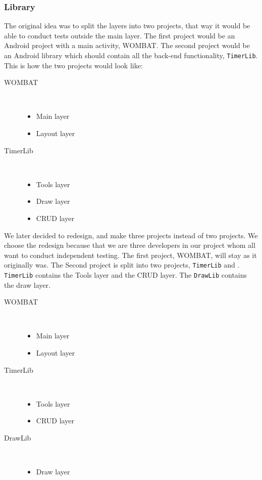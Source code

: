 \subsubsection{Library}

The original idea was to split the layers into two projects, that way it would be able to conduct tests outside the main layer. The first project would be an Android project with a main activity, WOMBAT. The second project would be an Android library which should contain all the back-end functionality, \texttt{TimerLib}. This is how the two projects would look like:

\begin{description}
  \item[WOMBAT] \hfill \\\begin{itemize}  \item Main layer  \item Layout layer
\end{itemize}
  \item[TimerLib] \hfill \\\begin{itemize}  \item Tools layer  \item Draw layer  \item CRUD layer
\end{itemize}
\end{description}

We later decided to redesign, and make three projects instead of two projects. We choose the redesign because that we are three developers in our project whom all want to conduct independent testing. The first project, WOMBAT, will stay as it originally was. The Second project is split into two projects, \texttt{TimerLib} and . \texttt{TimerLib} contains the Tools layer and the CRUD layer. The \texttt{DrawLib} contains the draw layer.

\begin{description}
  \item[WOMBAT] \hfill \\\begin{itemize}  \item Main layer  \item Layout layer\end{itemize}
  \item[TimerLib] \hfill \\\begin{itemize}  \item Tools layer  \item CRUD layer
\end{itemize}
  \item[DrawLib] \hfill \\\begin{itemize}  \item Draw layer\end{itemize}
\end{description}

